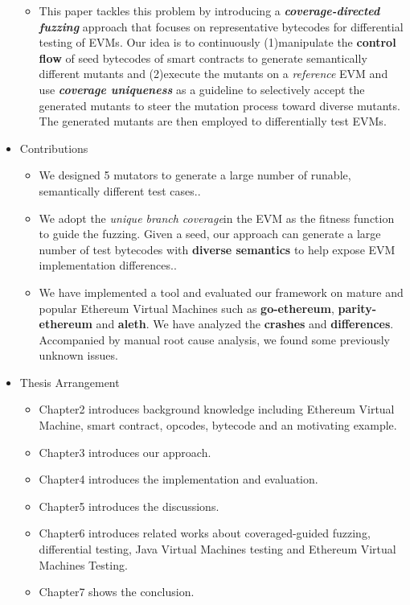 \documentclass[a4paper]{article}
\begin{document}
\begin{itemize}
\begin{itemize}
			\item This paper tackles this problem by introducing a \textit{\textbf{coverage-directed fuzzing}} approach that focuses on representative bytecodes for differential testing of EVMs. Our idea is to continuously (1)manipulate the \textbf{control flow} of seed bytecodes of smart contracts to generate semantically different mutants and (2)execute the mutants on a \textit{reference} EVM and use \textit{\textbf{coverage uniqueness}} as a guideline to selectively accept the generated mutants to steer the mutation process toward diverse mutants. The generated mutants are then employed to differentially test EVMs.
		\end{itemize}
		\item Contributions
		\begin{itemize}
			\item We designed 5 mutators to generate a large number of runable, semantically different test cases..
			\item We adopt the \textit{unique branch coverage}in the EVM as the fitness function to guide the fuzzing. Given a seed, our approach can generate a large number of test bytecodes with \textbf{diverse semantics} to help expose EVM implementation differences..
			\item We have implemented a tool and evaluated our framework on mature and popular Ethereum Virtual Machines such as \textbf{go-ethereum}, \textbf{parity-ethereum} and \textbf{aleth}. We have analyzed the \textbf{crashes} and \textbf{differences}. Accompanied by manual root cause analysis, we found some previously unknown issues.
		\end{itemize}
		\item Thesis Arrangement
		\begin{itemize}
			\item Chapter2 introduces background knowledge  including Ethereum Virtual Machine, smart contract, opcodes, bytecode and an motivating example. 
			\item Chapter3 introduces our approach.
			\item Chapter4 introduces the implementation and evaluation.
			\item Chapter5 introduces the discussions.
			\item Chapter6 introduces related works about coveraged-guided fuzzing, differential testing, Java Virtual Machines testing and Ethereum Virtual Machines Testing.
			\item Chapter7 shows the conclusion.
		\end{itemize}
	\end{itemize}
	
\end{document}
